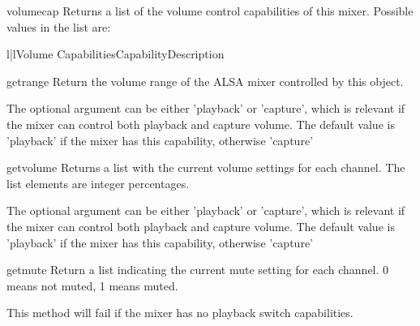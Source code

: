 \begin{methoddesc}[Mixer]{volumecap}{}
Returns a list of the volume control capabilities of this mixer. Possible values in
the list are:

\begin{tableii}{l|l}{Volume Capabilities}{Capability}{Description}
\end{tableii}

\end{methoddesc}

\begin{methoddesc}[Mixer]{getrange}{}
Return the volume range of the ALSA mixer controlled by this object.

The optional  argument can be either 'playback' or 'capture', 
which is relevant if the mixer can control both playback and capture volume. 
The default value is 'playback' if the mixer has this capability, otherwise 
'capture'

\end{methoddesc}

\begin{methoddesc}[Mixer]{getvolume}{}
Returns a list with the current volume settings for each channel. The list elements
are integer percentages.

The optional  argument can be either 'playback' or 'capture', which is relevant
if the mixer can control both playback and capture volume. The default value is 'playback'
if the mixer has this capability, otherwise 'capture'

\end{methoddesc}

\begin{methoddesc}[Mixer]{getmute}{}
Return a list indicating the current mute setting for each channel. 0 means not muted, 1 means muted.

This method will fail if the mixer has no playback switch capabilities.
\end{methoddesc}

